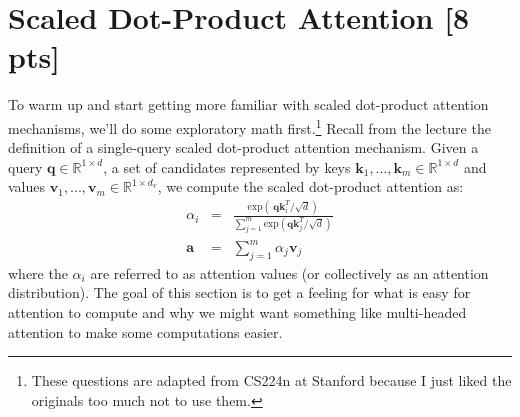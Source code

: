 \documentclass[a4paper,10pt]{article}
\begin{document}
\section{Scaled Dot-Product Attention [8 pts]}
To warm up and start getting more familiar with scaled dot-product attention mechanisms, we'll do some exploratory math first.\footnote{These questions are adapted from CS224n at Stanford because I just liked the originals too much not to use them.} Recall from the lecture the definition of a single-query scaled dot-product attention mechanism. Given a query $\mathbf{q} \in \mathbb{R}^{1\times d}$, a set of candidates represented by keys $\mathbf{k}_1, ... , \mathbf{k}_m \in \mathbb{R}^{1\times d}$ and values $\mathbf{v}_1, ... , \mathbf{v}_m \in \mathbb{R}^{1\times d_v}$, we compute the scaled dot-product attention as:
%
\begin{eqnarray}
\alpha_i &=& \frac{\mbox{exp}\left(~\mathbf{q}\mathbf{k}_i^T / \sqrt d\right)}{\sum_{j=1}^m \mbox{exp}\left(\mathbf{q}\mathbf{k}_j^T / \sqrt d\right)}\\
\mathbf{a} &=& \sum_{j=1}^m \alpha_j \mathbf{v}_j
\end{eqnarray}
%
where the $\alpha_i$ are referred to as attention values (or collectively as an attention distribution). The goal of this section is to get a feeling for what is easy for attention to compute and why we might want something like multi-headed attention to make some computations easier.
%
\vspace{5pt}
\begin{taskbox}
\end{taskbox}
\vspace{5pt}
%
\vspace{5pt}
\begin{taskbox}
\end{taskbox}
\end{document}
